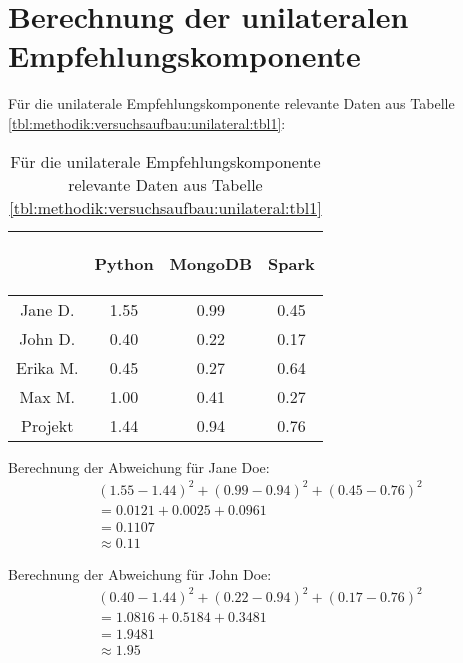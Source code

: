 \section{Berechnung der unilateralen Empfehlungskomponente}
\label{ch:nebenrechnungen:unilateral}
Für die unilaterale Empfehlungskomponente relevante Daten aus Tabelle \ref{tbl:methodik:versuchsaufbau:unilateral:tbl1}:

\begin{table}[h]
	\centering
	\begin{tabular}{c|c|c|c}
		& \begin{sideways}Python\end{sideways} & \begin{sideways}MongoDB\end{sideways} & \begin{sideways}Spark\end{sideways} \\
		\hline
		Jane D.  & 1.55 & 0.99 & 0.45\\
		John D.  & 0.40 & 0.22 & 0.17\\
		Erika M. & 0.45 & 0.27 & 0.64\\
		Max M.   & 1.00 & 0.41 & 0.27\\
		Projekt  & 1.44 & 0.94 & 0.76\\
	\end{tabular}
	\caption{Für die unilaterale Empfehlungskomponente relevante Daten aus Tabelle \ref{tbl:methodik:versuchsaufbau:unilateral:tbl1}}
	\label{tbl:nebenrechnungen:unilateral:tbl1}
\end{table}

Berechnung der Abweichung für Jane Doe:
\begin{gather}
	\nonumber (1.55-1.44)^2 + (0.99-0.94)^2 + (0.45-0.76)^2\\
	\nonumber = 0.0121 + 0.0025 + 0.0961\\
	\nonumber = 0.1107\\
	\approx 0.11
	\label{frml:nebenrechnungen:unilateral:jane}
\end{gather}

Berechnung der Abweichung für John Doe:
\begin{gather}
	\nonumber (0.40-1.44)^2 + (0.22-0.94)^2 + (0.17-0.76)^2\\
	\nonumber = 1.0816 + 0.5184 + 0.3481\\
	\nonumber = 1.9481\\
	\approx 1.95
	\label{frml:nebenrechnungen:unilateral:john}
\end{gather}

